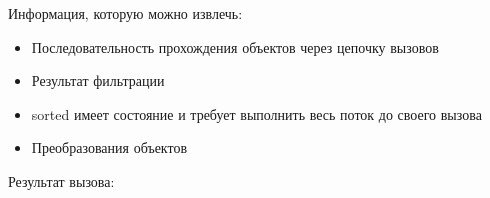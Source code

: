 \begin{frame}
\frametitle{\insertsection} 
\framesubtitle{\insertsubsection}
\fboxsep=0pt
\noindent
	\begin{minipage}[t]{0.48\linewidth}
		Информация, которую можно извлечь:
		\begin{itemize}
			\item Последовательность прохождения объектов через цепочку вызовов
			\item Результат фильтрации
			\item sorted имеет состояние и требует выполнить весь поток до своего вызова
			\item Преобразования объектов
		\end{itemize}
	\end{minipage}
	\hfill%
		\begin{minipage}[t]{0.48\linewidth}
			Результат вызова:
			\inputminted{text}{code/peekResults.txt}
		\end{minipage}
\end{frame}
